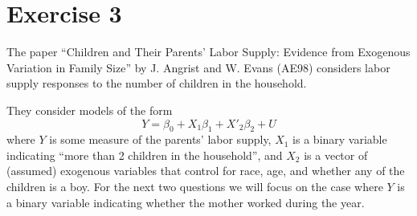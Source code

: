 \documentclass[12pt,oneside,reqno]{amsart}
\begin{document}
\section*{Exercise 3}

The paper “Children and Their Parents’ Labor Supply: Evidence from Exogenous Variation in Family Size” by J. Angrist and W. Evans (AE98) considers labor supply responses to the number of children in the household. 

They consider models of the form
\[Y = \beta_0 +X_1\beta_1+X'_2\beta_2 +U \]
where $Y$ is some measure of the parents’ labor supply, $X_1$ is a binary variable indicating “more than 2 children in the household”, and $X_2$ is a vector of (assumed) exogenous variables that control for race, age, and whether any of the children is a boy. For the next two questions we will focus on the case where $Y$ is a binary variable indicating whether the mother worked during the year.
\end{document}
